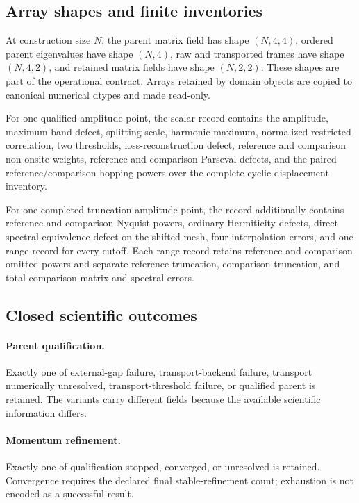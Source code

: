 \subsection{Array shapes and finite inventories}

At construction size $N$, the parent matrix field has shape $(N,4,4)$, ordered parent
eigenvalues have shape $(N,4)$, raw and transported frames have shape $(N,4,2)$, and
retained matrix fields have shape $(N,2,2)$.  These shapes are part of the operational
contract.  Arrays retained by domain objects are copied to canonical numerical dtypes and
made read-only.

For one qualified amplitude point, the scalar record contains the amplitude, maximum
band defect, splitting scale, harmonic maximum, normalized restricted correlation, two
thresholds, loss-reconstruction defect, reference and comparison non-onsite weights,
reference and comparison Parseval defects, and the paired reference/comparison hopping
powers over the complete cyclic displacement inventory.

For one completed truncation amplitude point, the record additionally contains reference
and comparison Nyquist powers, ordinary Hermiticity defects, direct spectral-equivalence
defect on the shifted mesh, four interpolation errors, and one range record for every
cutoff.  Each range record retains reference and comparison omitted powers and separate
reference truncation, comparison truncation, and total comparison matrix and spectral
errors.

\subsection{Closed scientific outcomes}

\paragraph{Parent qualification.}
Exactly one of external-gap failure, transport-backend failure, transport numerically
unresolved, transport-threshold failure, or qualified parent is retained.  The variants
carry different fields because the available scientific information differs.

\paragraph{Momentum refinement.}
Exactly one of qualification stopped, converged, or unresolved is retained.  Convergence
requires the declared final stable-refinement count; exhaustion is not encoded as a
successful result.

